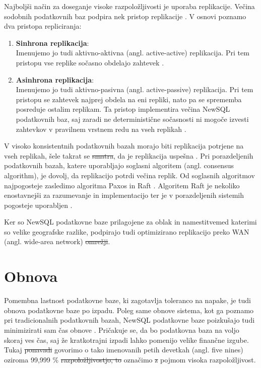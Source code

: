 \documentclass[a4paper, 12pt]{book}
\providecommand{\DIFaddtex}[1]{{\protect\color{blue}\uwave{#1}}} %
\providecommand{\DIFdeltex}[1]{{\protect\color{red}\sout{#1}}}                      %
\providecommand{\DIFaddbegin}{} %
\providecommand{\DIFaddend}{} %
\providecommand{\DIFdelbegin}{} %
\providecommand{\DIFdelend}{} %
\providecommand{\DIFadd}[1]{\texorpdfstring{\DIFaddtex{#1}}{#1}} %
\providecommand{\DIFdel}[1]{\texorpdfstring{\DIFdeltex{#1}}{}} %
\newcommand{\DIFscaledelfig}{0.5}
\newlength{\DIFdelgraphicswidth} %
\newlength{\DIFdelgraphicsheight} %
\newcommand{\DIFaddincludegraphics}[2][]{{\color{blue}\fbox{\DIFOincludegraphics[#1]{#2}}}} %
\newcommand{\DIFdelincludegraphics}[2][]{%
\sbox{\DIFdelgraphicsbox}{\DIFOincludegraphics[#1]{#2}}%
\settoboxwidth{\DIFdelgraphicswidth}{\DIFdelgraphicsbox} %
\settoboxtotalheight{\DIFdelgraphicsheight}{\DIFdelgraphicsbox} %
\scalebox{\DIFscaledelfig}{%
\parbox[b]{\DIFdelgraphicswidth}{\usebox{\DIFdelgraphicsbox}\\[-\baselineskip] \rule{\DIFdelgraphicswidth}{0em}}\llap{\resizebox{\DIFdelgraphicswidth}{\DIFdelgraphicsheight}{%
\setlength{\unitlength}{\DIFdelgraphicswidth}%
\begin{picture}(1,1)%
\thicklines\linethickness{2pt} %
{\color[rgb]{1,0,0}\put(0,0){\framebox(1,1){}}}%
{\color[rgb]{1,0,0}\put(0,0){\line( 1,1){1}}}%
{\color[rgb]{1,0,0}\put(0,1){\line(1,-1){1}}}%
\end{picture}%
}\hspace*{3pt}}} %
} %
\DeclareRobustCommand{\DIFaddbegin}{\DIFOaddbegin \let\includegraphics\DIFaddincludegraphics} %
\DeclareRobustCommand{\DIFaddend}{\DIFOaddend \let\includegraphics\DIFOincludegraphics} %
\DeclareRobustCommand{\DIFdelbegin}{\DIFOdelbegin \let\includegraphics\DIFdelincludegraphics} %
\DeclareRobustCommand{\DIFdelend}{\DIFOaddend \let\includegraphics\DIFOincludegraphics} %
\begin{document}
Najboljši način za doseganje visoke razpoložljivosti je uporaba replikacije. Večina sodobnih podatkovnih baz podpira nek pristop replikacije \cite{Pavlo2016Sep}. V osnovi poznamo dva pristopa repliciranja:
\begin{enumerate}
    \item \textbf{Sinhrona replikacija}:\\Imenujemo jo tudi aktivno-aktivna (angl. active-active) replikacija. Pri tem pristopu vse replike sočasno obdelajo zahtevek \cite{Pavlo2016Sep}.

    \item \textbf{Asinhrona replikacija}:\\Imenujemo jo tudi aktivno-pasivna (angl. active-passive) replikacija. Pri tem pristopu se zahtevek najprej obdela na eni repliki, nato pa se sprememba posreduje ostalim replikam. Ta pristop implementira večina NewSQL podatkovnih baz, saj zaradi ne deterministične sočas\-nosti ni mogoče izvesti zahtevkov v pravilnem vrstnem redu na vseh replikah \cite{Pavlo2016Sep, harding2017evaluation}.
\end{enumerate}

V visoko konsistentnih podatkovnih bazah morajo biti replikacija potrjene na vseh replikah, šele takrat se \DIFdelbegin \DIFdel{smatra}\DIFdelend \DIFaddbegin \DIFadd{šteje}\DIFaddend , da je replikacija uspešna \cite{NewSqlInMemoryAnalytics}. Pri porazdeljenih podatkovnih bazah, katere uporabljajo soglasni algoritem (angl. consensus algorithm), je dovolj, da replikacijo potrdi večina replik. Od soglasnih algoritmov najpogosteje zasledimo algoritma Paxos in Raft \cite{raft-vs-paxos}. Algoritem Raft je nekoliko enostavnejši za razumevanje in implementacijo ter je v porazdeljenih sistemih pogosteje uporabljen \cite{raft-vs-paxos}. 

Ker so NewSQL podatkovne baze prilagojene za oblak in namestitve\DIFaddbegin \DIFadd{, }\DIFaddend med katerimi so velike geografske razlike, podpirajo tudi optimizirano replikacijo preko WAN (angl. wide-area network) \DIFdelbegin \DIFdel{omrežji}\DIFdelend \DIFaddbegin \DIFadd{omrežij}\DIFaddend .

\section{Obnova}
Pomembna lastnost podatkovne baze, ki zagotavlja toleranco na napake, je tudi obnova podatkovne baze po izpadu. Poleg same obnove sistema, kot ga poznamo pri tradicionalnih podatkovnih bazah, NewSQL podatkovne baze  poizkušajo tudi minimizirati sam čas obnove \cite{Pavlo2016Sep}. Pričakuje se, da bo podatkovna baza na voljo skoraj ves čas, saj že kratkotrajni izpadi lahko pomenijo velike finančne izgube. Tukaj \DIFdelbegin \DIFdel{ponavadi }\DIFdelend \DIFaddbegin \DIFadd{po navadi }\DIFaddend govorimo o tako imenovanih petih devetkah (angl. five nines) oziroma 99,999 \% \DIFdelbegin \DIFdel{razpoložljivostjo, to }\DIFdelend \DIFaddbegin \DIFadd{razpoložljivosti, kar }\DIFaddend označimo \DIFdelbegin \DIFdel{z }\DIFdelend \DIFaddbegin \DIFadd{s }\DIFaddend pojmom visoka razpoložljivost.
\end{document}
